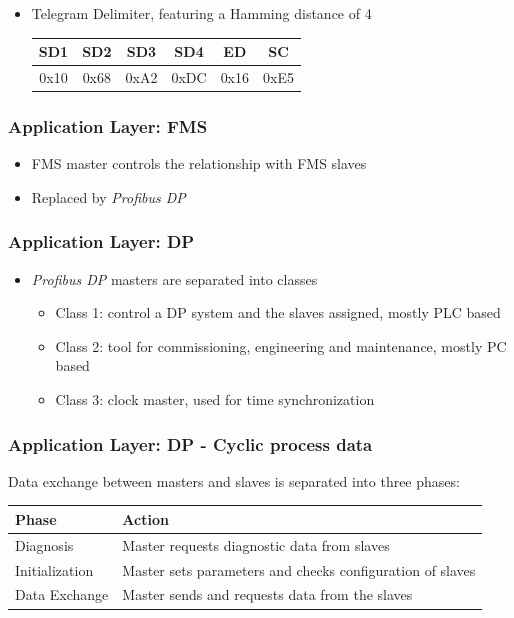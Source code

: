 \documentclass{beamer}
\begin{document}
\begin{frame}
\begin{itemize}
      \hfill \\
    \item Telegram Delimiter, featuring a Hamming distance of 4 \\
      \footnotesize
      \begin{tabular}[h]{|c|c|c|c|c|c|}
        \hline
        SD1   & SD2   & SD3   & SD4   & ED    & SC \\
        \hline
        0x10  & 0x68  & 0xA2  & 0xDC  & 0x16  & 0xE5 \\
        \hline
      \end{tabular}
      \normalsize
  \end{itemize}
\end{frame}

\begin{frame}
  \frametitle{Application Layer: FMS}
  \begin{itemize}
    \item FMS master controls the relationship with FMS slaves
    \item Replaced by \textit{Profibus DP}
  \end{itemize}
\end{frame}

\begin{frame}
  \frametitle{Application Layer: DP}
  \begin{itemize}
    \item \textit{Profibus DP} masters are separated into classes
      \begin{itemize}
        \item Class 1: control a DP system and the slaves assigned, mostly PLC based
        \item Class 2: tool for commissioning, engineering and maintenance, mostly PC
          based
        \item Class 3: clock master, used for time synchronization
      \end{itemize}
  \end{itemize}
\end{frame}

\begin{frame}
  \frametitle{Application Layer: DP - Cyclic process data}
  Data exchange between masters and slaves is separated into three
  phases:~\cite{profibusmanual}
  \center
  \footnotesize
  \begin{tabular}[h]{l|l}
    \textbf{Phase}  & \textbf{Action} \\
    \hline
    Diagnosis       & Master requests diagnostic data from slaves \\
    Initialization  & Master sets parameters and checks configuration of slaves \\
    Data Exchange   & Master sends and requests data from the slaves
  \end{tabular} \\
\end{frame}
\end{document}
